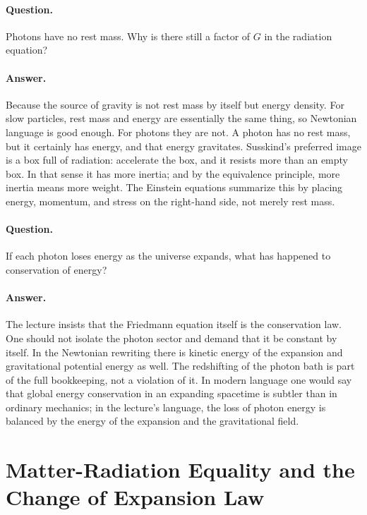 \paragraph{Question.} Photons have no rest mass. Why is there still a factor of \(G\) in the radiation equation?

\paragraph{Answer.} Because the source of gravity is not rest mass by itself but energy density. For slow particles, rest mass and energy are essentially the same thing, so Newtonian language is good enough. For photons they are not. A photon has no rest mass, but it certainly has energy, and that energy gravitates. Susskind's preferred image is a box full of radiation: accelerate the box, and it resists more than an empty box. In that sense it has more inertia; and by the equivalence principle, more inertia means more weight. The Einstein equations summarize this by placing energy, momentum, and stress on the right-hand side, not merely rest mass.

\paragraph{Question.} If each photon loses energy as the universe expands, what has happened to conservation of energy?

\paragraph{Answer.} The lecture insists that the Friedmann equation itself is the conservation law. One should not isolate the photon sector and demand that it be constant by itself. In the Newtonian rewriting there is kinetic energy of the expansion and gravitational potential energy as well. The redshifting of the photon bath is part of the full bookkeeping, not a violation of it. In modern language one would say that global energy conservation in an expanding spacetime is subtler than in ordinary mechanics; in the lecture's language, the loss of photon energy is balanced by the energy of the expansion and the gravitational field.

\section{Matter-Radiation Equality and the Change of Expansion Law}

